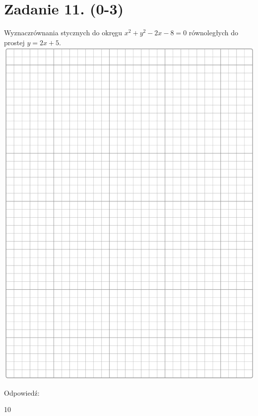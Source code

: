 \documentclass[10pt]{article}
\begin{document}
\section*{Zadanie 11. (0-3)}
Wyznaczrównania stycznych do okręgu \(x^{2}+y^{2}-2 x-8=0\) równoległych do prostej \(y=2 x+5\).\\
\includegraphics[max width=\textwidth, center]{2024_11_21_e30d1f37bf0e3631c088g-10}

Odpowiedź:

10
\end{document}
